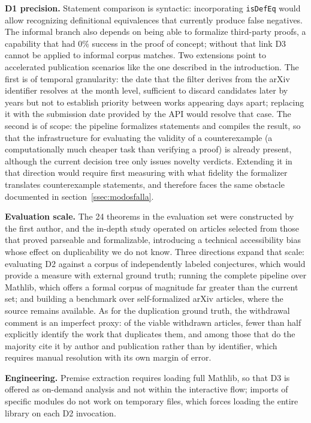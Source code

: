 \documentclass{article}
\theoremstyle{remark}
\begin{document}
\textbf{D1 precision.} Statement comparison is syntactic: incorporating \texttt{isDefEq} would allow recognizing definitional equivalences that currently produce false negatives. The informal branch also depends on being able to formalize third-party proofs, a capability that had 0\% success in the proof of concept; without that link D3 cannot be applied to informal corpus matches.
Two extensions point to accelerated publication scenarios like the one described in the introduction. The first is of temporal granularity: the date that the filter derives from the arXiv identifier resolves at the month level, sufficient to discard candidates later by years but not to establish priority between works appearing days apart; replacing it with the submission date provided by the API would resolve that case. The second is of scope: the pipeline formalizes statements and compiles the result, so that the infrastructure for evaluating the validity of a counterexample (a computationally much cheaper task than verifying a proof) is already present, although the current decision tree only issues novelty verdicts. Extending it in that direction would require first measuring with what fidelity the formalizer translates counterexample statements, and therefore faces the same obstacle documented in section~\ref{ssec:modosfalla}.

\textbf{Evaluation scale.} The 24 theorems in the evaluation set were constructed by the first author, and the in-depth study operated on articles selected from those that proved parseable and formalizable, introducing a technical accessibility bias whose effect on duplicability we do not know. Three directions expand that scale: evaluating D2 against a corpus of independently labeled conjectures, which would provide a measure with external ground truth; running the complete pipeline over Mathlib, which offers a formal corpus of magnitude far greater than the current set; and building a benchmark over self-formalized arXiv articles, where the source remains available. As for the duplication ground truth, the withdrawal comment is an imperfect proxy: of the viable withdrawn articles, fewer than half explicitly identify the work that duplicates them, and among those that do the majority cite it by author and publication rather than by identifier, which requires manual resolution with its own margin of error.

\textbf{Engineering.} Premise extraction requires loading full Mathlib, so that D3 is offered as on-demand analysis and not within the interactive flow; imports of specific modules do not work on temporary files, which forces loading the entire library on each D2 invocation.
\end{document}
